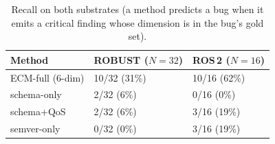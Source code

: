 \begin{table}[!ht]\centering
\caption{Recall on both substrates (a method predicts a bug when it emits a critical finding whose dimension is in the bug's gold set).}
\label{tab:pathb_recall}\small
\begin{tabularx}{\linewidth}{@{}lXX@{}}\toprule
\textbf{Method} & \textbf{ROBUST ($N{=}32$)} & \textbf{ROS\,2 ($N{=}16$)} \\\midrule
ECM-full (6-dim) & 10/32 (31\%) & 10/16 (62\%) \\
schema-only & 2/32 (6\%) & 0/16 (0\%) \\
schema+QoS & 2/32 (6\%) & 3/16 (19\%) \\
semver-only & 0/32 (0\%) & 3/16 (19\%) \\
\bottomrule\end{tabularx}\end{table}